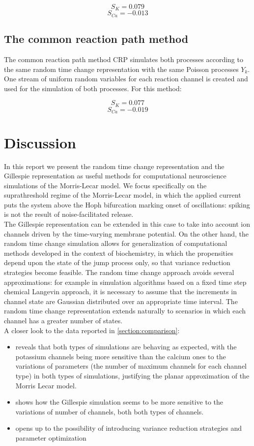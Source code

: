 	$$S_{K} = 0.079$$
	$$S_{Ca} = -0.013$$

 	\subsection{The common reaction path method}
	The common reaction path method CRP simulates both processes according to the same random time change representation with the same Poisson processes $Y_k$.
	One stream of uniform random variables for each reaction channel is created and used for the simulation of both processes. For this method:


	$$S_{K} = 0.077$$
	$$S_{Ca} = -0.019$$

\section{Discussion}
\label{section:discussion}

In this report we present the random time change representation and the Gillespie representation as useful methods for computational neuroscience simulations of the Morris-Lecar model. We focus specifically on the suprathreshold regime of the Morris-Lecar model, in which the applied current puts the system above the Hoph bifurcation marking onset of oscillations: spiking is not the result of noise-facilitated release. \\

The Gillespie representation can be extended in this case to take into account ion channels driven by the time-varying membrane potential. On the other hand, the random time change simulation allows for generalization of computational methods developed in the context of biochemistry, in which the propensities depend upon the state of the jump process only, so that variance reduction strategies become feasible. The random time change approach avoids several approximations: for example in simulation algorithms based on a fixed time step chemical Langevin approach, it is necessary to assume that the increments in channel state are Gaussian distributed over an appropriate time interval. The random time change representation extends naturally to scenarios in which each channel has a greater number of states. \\

A closer look to the data reported in \ref{section:comparison}:
\begin{itemize}
	\item reveals that both types of simulations are behaving as expected, with the potassium channels being more sensitive than the calcium ones to the variations of parameters (the number of maximum channels for each channel type) in both types of simulations, justifying the planar approximation of the Morris Lecar model.
	\item shows how the Gillespie simulation seems to be more sensitive to the variations of number of channels, both both types of channels.\\
	\item opens up to the possibility of introducing variance reduction strategies and parameter optimization
\end{itemize}


